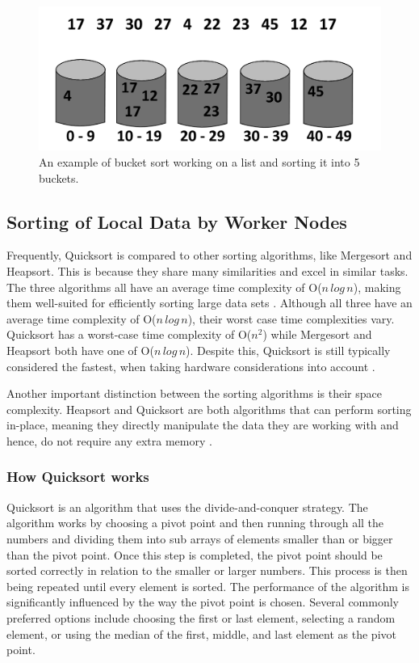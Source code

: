 \begin{figure}[h]
    \centering
    \includegraphics[scale=0.25]{figures/Bucketsort.png}
    \caption{An example of bucket sort working on a list and sorting it into 5 buckets.}
    \label{fig:bucketsort}
\end{figure}


\subsection{Sorting of Local Data by Worker Nodes} \label{sec:quicksortDesc}
Frequently, Quicksort is compared to other sorting algorithms, like Mergesort and Heapsort. This is because they share many similarities and excel in similar tasks. The three algorithms all have an average time complexity of O($n\,log\,n$), making them well-suited for efficiently sorting large data sets \cite{Algorithm_sorts_stanford}. Although all three have an average time complexity of O($n\,log\,n$), their worst case time complexities vary. Quicksort has a worst-case time complexity of O($n^2$) while Mergesort and Heapsort both have one of O($n\,log\,n$). Despite this, Quicksort is still typically considered the fastest, when taking hardware considerations into account \cite{Quicksort_better_answer}.


Another important distinction between the sorting algorithms is their space complexity. Heapsort and Quicksort are both algorithms that can perform sorting in-place, meaning they directly manipulate the data they are working with and hence, do not require any extra memory \cite{In-place_guide}.

\subsubsection{How Quicksort works} \label{HowDoesQuicksortWork}
Quicksort is an algorithm that uses the divide-and-conquer strategy. The algorithm works by choosing a pivot point and then running through all the numbers and dividing them into sub arrays of elements smaller than or bigger than the pivot point. Once this step is completed, the pivot point should be sorted correctly in relation to the smaller or larger numbers. This process is then being repeated until every element is sorted. The performance of the algorithm is significantly influenced by the way the pivot point is chosen. Several commonly preferred options include choosing the first or last element, selecting a random element, or using the median of the first, middle, and last element as the pivot point.


